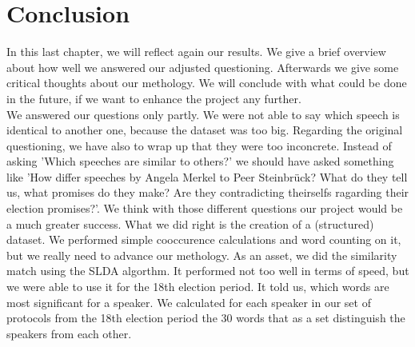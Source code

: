 \documentclass[12pt,paper=a4,nenglish]{scrreprt}
\begin{document}
\chapter{Conclusion}
In this last chapter, we will reflect again our results. We give a brief
overview about how well we answered our adjusted questioning. Afterwards we
give some critical thoughts about our methology. We will conclude with what
could be done in the future, if we want to enhance the project any further.\\
We answered our questions only partly. We were not able to say which speech is
identical to another one, because the dataset was too big. 
Regarding the original questioning, we have also to wrap up that they were 
too inconcrete. Instead of asking 'Which speeches are similar to others?' we
should have asked something like 'How differ speeches by Angela Merkel to Peer
Steinbrück? What do they tell us, what promises do they make? Are they
contradicting theirselfs ragarding their election promises?'. 
We think with those different questions our project would be a much greater success. What we did right is the creation of a
(structured) dataset. We performed simple cooccurence calculations and word
counting on it, but we really need to advance our methology. As an asset, we
did the similarity match using the SLDA algorthm. It performed not too well in
terms of speed, but we were able to use it for the 18th election period. It told
us, which words are most significant for a speaker. We calculated for each speaker in our set of protocols from the 18th election period the 30 words that as a set distinguish the speakers from each other.





\end{document}
